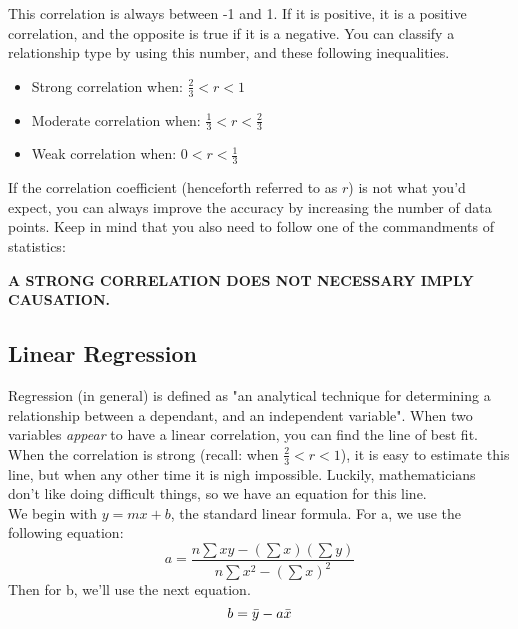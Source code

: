     This correlation is always between -1 and 1.
    If it is positive, it is a positive correlation, and the opposite is true if it is a negative. 
    You can classify a relationship type by using this number, and these following inequalities.
    \begin{center}
        \begin{itemize}
            \item Strong correlation when: $\frac{2}{3} < r < 1$
            \item Moderate correlation when: $\frac{1}{3} < r < \frac{2}{3}$
            \item Weak correlation when: $0 < r < \frac{1}{3} $
        \end{itemize}
    \end{center}
    If the correlation coefficient (henceforth referred to as $r$) is not what you'd expect, you can always improve the accuracy by increasing the number of data points. Keep in mind that you also need to follow one of the commandments of statistics: 
    \begin{center}
        \large \textbf{A STRONG CORRELATION DOES NOT NECESSARY IMPLY CAUSATION.}
    \end{center}
    
    \subsection{Linear Regression}
    Regression (in general) is defined as "an analytical technique for determining a relationship between a dependant, and an independent variable".
    When two variables \emph{appear} to have a linear correlation, you can find the line of best fit. 
    When the correlation is strong (recall: when $\frac{2}{3} < r < 1$), it is easy to estimate this line, but when any other time it is nigh impossible.
    Luckily, mathematicians don't like doing difficult things, so we have an equation for this line.\\
    
    We begin with $y = mx + b$, the standard linear formula.
    For a, we use the following equation:
    \begin{equation*}
        a = \frac{n\sum xy - (\sum x)(\sum y)}{n\sum x^{2} - (\sum x)^{2}}
    \end{equation*}
    Then for b, we'll use the next equation.
    \begin{equation*}
        b = \bar{y} - a\bar{x}
    \end{equation*}
    
